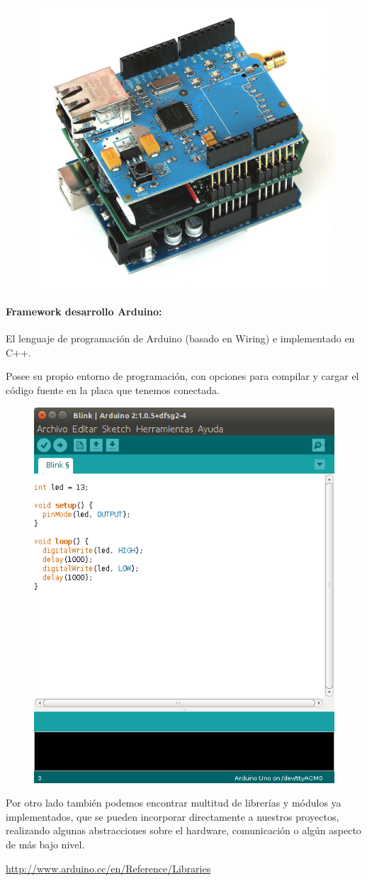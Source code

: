 \begin{figure}[h]
\centering
\includegraphics[width=0.4\linewidth]{../images/arduinoshield}
\caption{}
\label{fig:arduinoshield}
\end{figure}

\newpage


\paragraph{Framework desarrollo Arduino:}

El lenguaje de programación de Arduino (basado en Wiring) e implementado en C++.

\bigskip
Posee su propio entorno de programación, con opciones para compilar y cargar el código fuente en la placa que tenemos conectada.

\begin{figure}[h]
\centering
\includegraphics[width=0.4\linewidth]{../images/arduinoide}
\caption{}
\label{fig:arduinoide}
\end{figure}

Por otro lado también podemos encontrar multitud de librerías y módulos ya implementados, que se pueden incorporar directamente a nuestros proyectos, realizando algunas abstracciones sobre el hardware, comunicación o algún aspecto de más bajo nivel.

\bigskip
\url{http://www.arduino.cc/en/Reference/Libraries}
\href{http://www.arduino.cc/en/Reference/Libraries}{ }

